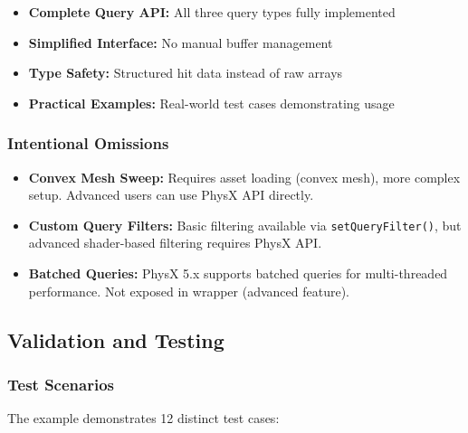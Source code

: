 \begin{itemize}
    \item \textbf{Complete Query API:} All three query types fully implemented
    \item \textbf{Simplified Interface:} No manual buffer management
    \item \textbf{Type Safety:} Structured hit data instead of raw arrays
    \item \textbf{Practical Examples:} Real-world test cases demonstrating usage
\end{itemize}

\subsubsection{Intentional Omissions}

\begin{itemize}
    \item \textbf{Convex Mesh Sweep:} Requires asset loading (convex mesh), more complex setup. Advanced users can use PhysX API directly.
    \item \textbf{Custom Query Filters:} Basic filtering available via \texttt{setQueryFilter()}, but advanced shader-based filtering requires PhysX API.
    \item \textbf{Batched Queries:} PhysX 5.x supports batched queries for multi-threaded performance. Not exposed in wrapper (advanced feature).
\end{itemize}


\subsection{Validation and Testing}

\subsubsection{Test Scenarios}

The example demonstrates 12 distinct test cases:

